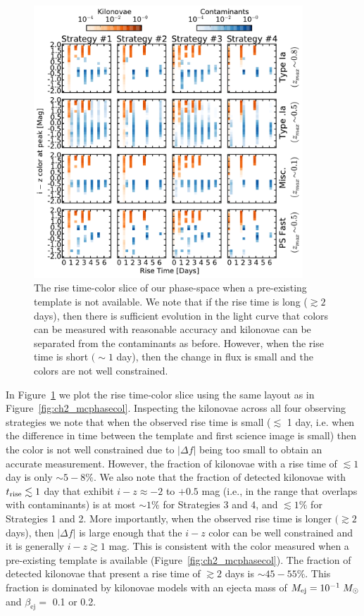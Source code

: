 \begin{figure}[t!]
\centering
\includegraphics[width=0.9\textwidth]{./figs/chapter2/ch2_f14.pdf}
\caption{The rise time-color slice of our phase-space when a pre-existing template is not available. We note that if the rise time is long ($\gtrsim2$ days), then there is sufficient evolution in the light curve that colors can be measured with reasonable accuracy and kilonovae can be separated from the contaminants as before. However, when the rise time is short $(\sim 1$ day), then the change in flux is small and the colors are not well constrained.}
\label{fig:ch2_phaserisediff}
\end{figure}

In Figure~\ref{fig:ch2_phaserisediff} we plot the rise time-color slice using the same layout as in Figure~\ref{fig:ch2_mcphasecol}. Inspecting the kilonovae across all four observing strategies we note that when the observed rise time is small ($\lesssim$ 1 day, i.e. when the difference in time between the template and first science image is small) then the color is not well constrained due to $|\Delta f|$ being too small to obtain an accurate measurement. However, the fraction of kilonovae with a rise time of $\lesssim1$ day is only $\sim5-8\%$. We also note that the fraction of detected kilonovae with $t_{{\rm rise}} \lesssim 1$ day that exhibit $i-z\approx -2$ to $+0.5$ mag (i.e., in the range that overlaps with contaminants) is at most $\sim1\%$ for Strategies 3 and 4, and $\lesssim1\%$ for Strategies 1 and 2. More importantly, when the observed rise time is longer $(\gtrsim 2$ days), then $|\Delta f|$ is large enough that the $i-z$ color can be well constrained and it is generally $i-z\gtrsim1$ mag. This is consistent with the color measured when a pre-existing template is available (Figure~\ref{fig:ch2_mcphasecol}). The fraction of detected kilonovae that present a rise time of $\gtrsim 2$ days is $\sim45-55\%$. This fraction is dominated by kilonovae models with an ejecta mass of $M_{\rm ej} = 10^{-1} \;M_{\odot}$ and $\beta_{\text{ej}} = $ 0.1 or 0.2.

